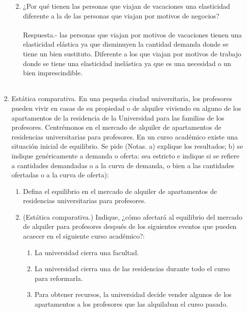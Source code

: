 \begin{enumerate}
\begin{enumerate}[\bfseries a.]
\begin{enumerate}[\bfseries (i)]
		\end{enumerate}

	    \item ¿Por qué tienen las personas que viajan de vacaciones una elasticidad diferente a la de las personas que viajan por motivos de negocios?\\\\
		Respuesta.-\; las personas que viajan por motivos de vacaciones tienen una elasticidad elástica ya que disminuyen la cantidad demanda donde se tiene un bien sustituto. Diferente a los que viajan por motivos de trabajo donde se tiene una elasticidad inelástica ya que es una necesidad o un bien imprescindible.\\\\

	\end{enumerate}

    \item Estática comparativa. En una pequeña ciudad universitaria, los profesores pueden vivir en casas de su propiedad o de alquiler viviendo en alguno de los apartamentos de la residencia de la Universidad para las familias de los profesores. Centrémonos en el mercado de alquiler de apartamentos de residencias universitarias para profesores. En un curso académico existe una situación inicial de
equilibrio. Se pide (Notas. a) explique los resultados; b) se indique genéricamente a demanda o oferta: sea estricto e indique si se refiere a cantidades demandadas o a la curva de demanda, o bien a las
cantidades ofertadas o a la curva de oferta):

	\begin{enumerate}[\bfseries a.]

	    \item Defina el equilibrio en el mercado de alquiler de apartamentos de residencias universitarias para profesores.

	    \item (Estática comparativa.) Indique, ¿cómo afectará al equilibrio del mercado de alquiler para profesores después de los siguientes eventos que pueden acaecer en el siguiente curso académico?:

		\begin{enumerate}[\bfseries b.1)]

		    \item La universidad cierra una facultad.

		    \item La universidad cierra una de las residencias durante todo el curso para reformarla.

		    \item Para obtener recursos, la universidad decide vender algunos de los apartamentos a los profesores que las alquilaban el curso pasado.

		\end{enumerate}
	\end{enumerate}
\end{enumerate}

